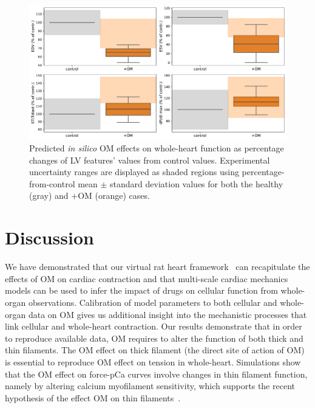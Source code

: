 \begin{figure}[!ht]
    \myfloatalign
    \includegraphics[width=\textwidth]{figures/chapter05/Fig3.pdf}
    \caption{Predicted \textit{in silico} OM effects on whole-heart function as percentage changes of LV features' values from control values. Experimental uncertainty ranges are displayed as shaded regions using percentage-from-control mean $\pm$ standard deviation values for both the healthy (gray) and $+$OM (orange) cases.}
    \label{fig:lvfeatsdistr}
\end{figure}


%
%
%
\section{Discussion}\label{sec:ch5discussion}
We have demonstrated that our virtual rat heart framework~\cite{Longobardi:2020} can recapitulate the effects of OM on cardiac contraction and that multi-scale cardiac mechanics models can be used to infer the impact of drugs on cellular function from whole-organ observations. Calibration of model parameters to both cellular and whole-organ data on OM gives us additional insight into the mechanistic processes that link cellular and whole-heart contraction. Our results demonstrate that in order to reproduce available data, OM requires to alter the function of both thick and thin filaments. The OM effect on thick filament (the direct site of action of OM) is essential to reproduce OM effect on tension in whole-heart. Simulations show that the OM effect on force-pCa curves involve changes in thin filament function, namely by altering calcium myofilament sensitivity, which supports the recent hypothesis of the effect OM on thin filaments~\cite{Swenson:2017}.


